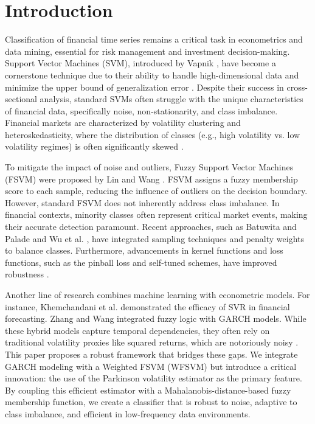 \documentclass[twoside]{article}
\begin{document}
	\section{Introduction}
	\label{Introduction}
	Classification of financial time series remains a critical task in econometrics and data mining, essential for risk management and investment decision-making. Support Vector Machines (SVM), introduced by Vapnik \cite{Vapnik1995}, have become a cornerstone technique due to their ability to handle high-dimensional data and minimize the upper bound of generalization error \cite{Boser1992}. Despite their success in cross-sectional analysis, standard SVMs often struggle with the unique characteristics of financial data, specifically noise, non-stationarity, and class imbalance. Financial markets are characterized by volatility clustering and heteroskedasticity, where the distribution of classes (e.g., high volatility vs. low volatility regimes) is often significantly skewed \cite{Andersen1998}.
	
	To mitigate the impact of noise and outliers, Fuzzy Support Vector Machines (FSVM) were proposed by Lin and Wang \cite{Lin2002}. FSVM assigns a fuzzy membership score to each sample, reducing the influence of outliers on the decision boundary. However, standard FSVM does not inherently address class imbalance. In financial contexts, minority classes often represent critical market events, making their accurate detection paramount. Recent approaches, such as Batuwita and Palade \cite{Batuwita2010} and Wu et al. \cite{Wu2017}, have integrated sampling techniques and penalty weights to balance classes. Furthermore, advancements in kernel functions and loss functions, such as the pinball loss and self-tuned schemes, have improved robustness \cite{Verma2023, Tanveer2024}.
	
	Another line of research combines machine learning with econometric models. For instance, Khemchandani et al. \cite{Khemchandani2009} demonstrated the efficacy of SVR in financial forecasting. Zhang and Wang \cite{Zhang2009} integrated fuzzy logic with GARCH models. While these hybrid models capture temporal dependencies, they often rely on traditional volatility proxies like squared returns, which are notoriously noisy \cite{Degiannakis2013}. This paper proposes a robust framework that bridges these gaps. We integrate GARCH modeling with a Weighted FSVM (WFSVM) but introduce a critical innovation: the use of the Parkinson volatility estimator \cite{Parkinson1980} as the primary feature. By coupling this efficient estimator with a Mahalanobis-distance-based fuzzy membership function, we create a classifier that is robust to noise, adaptive to class imbalance, and efficient in low-frequency data environments.
	
\end{document}
